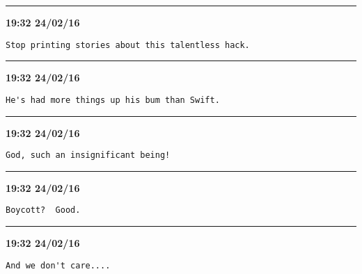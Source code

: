 \hrule%

\begin{adjustwidth}{0cm}{0cm}
\footnotesize \textbf{19:32 24/02/16}

\begin{lstlisting}[breaklines, breakatwhitespace, basicstyle=\small, frame=leftline]
Stop printing stories about this talentless hack.
\end{lstlisting}
\end{adjustwidth}

\hrule%

\begin{adjustwidth}{0cm}{0cm}
\footnotesize \textbf{19:32 24/02/16}

\begin{lstlisting}[breaklines, breakatwhitespace, basicstyle=\small, frame=leftline]
He's had more things up his bum than Swift.
\end{lstlisting}
\end{adjustwidth}

\hrule%

\begin{adjustwidth}{0cm}{0cm}
\footnotesize \textbf{19:32 24/02/16}

\begin{lstlisting}[breaklines, breakatwhitespace, basicstyle=\small, frame=leftline]
God, such an insignificant being!
\end{lstlisting}
\end{adjustwidth}

\hrule%

\begin{adjustwidth}{0cm}{0cm}
\footnotesize \textbf{19:32 24/02/16}

\begin{lstlisting}[breaklines, breakatwhitespace, basicstyle=\small, frame=leftline]
Boycott?  Good.
\end{lstlisting}
\end{adjustwidth}

\hrule%

\begin{adjustwidth}{0cm}{0cm}
\footnotesize \textbf{19:32 24/02/16}

\begin{lstlisting}[breaklines, breakatwhitespace, basicstyle=\small, frame=leftline]
And we don't care....
\end{lstlisting}
\end{adjustwidth}

